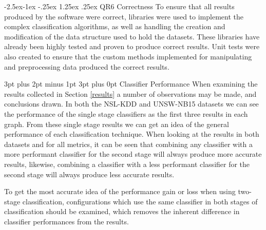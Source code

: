 \documentclass[12pt,a4paper]{article}
\makeatletter
\renewcommand\paragraph{\@startsection{paragraph}{4}{\z@}%
  {-2.5ex\@plus -1ex \@minus -.25ex}%
  {1.25ex \@plus .25ex}%
  {\normalfont\normalsize\bfseries}}
\renewcommand\subsection{\@startsection {subsection}{1}{2mm} %
      {3pt plus 2pt minus 1pt} %
      {3pt plus 0pt} %
      {\normalfont\bfseries}}
\makeatother
\begin{document}
\paragraph{QR6 Correctness}
To ensure that all results produced by the software were correct, libraries were used to implement the complex classification algorithms, as well as handling the creation and modification of the data structure used to hold the datasets. These libraries have already been highly tested and proven to produce correct results. Unit tests were also created to ensure that the custom methods implemented for manipulating and preprocessing data produced the correct results.

\subsection{Classifier Performance}
When examining the results collected in Section \ref{results} a number of observations may be made, and conclusions drawn. In both the NSL-KDD and UNSW-NB15 datasets we can see the performance of the single stage classifiers as the first three results in each graph. From these single stage results we can get an idea of the general performance of each classification technique. When looking at the results in both datasets and for all metrics, it can be seen that combining any classifier with a more performant classifier for the second stage will always produce more accurate results, likewise, combining a classifier with a less performant classifier for the second stage will always produce less accurate results.

To get the most accurate idea of the performance gain or loss when using two-stage classification, configurations which use the same classifier in both stages of classification should be examined, which removes the inherent difference in classifier performances from the results.
\end{document}
